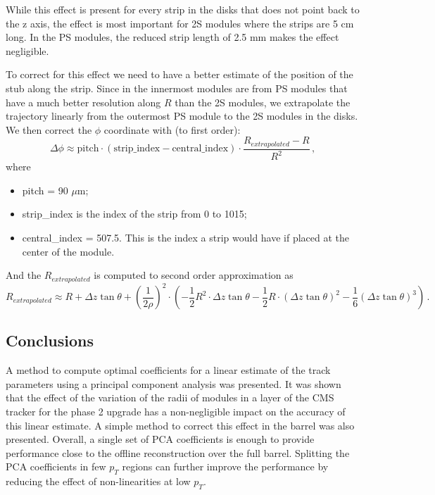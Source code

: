 \documentclass[10pt,a4paper]{report}
\begin{document}
While this effect is present for every strip in the disks that does not point back to the z axis, the effect is most important for 2S modules where the strips are 5 cm long. In the PS modules, the reduced strip length of 2.5 mm makes the effect negligible.

To correct for this effect we need to have a better estimate of the position of the stub along the strip. Since in the innermost modules are from PS modules that have a much better resolution along $R$ than the 2S modules, we extrapolate the trajectory linearly from the outermost PS module to the 2S modules in the disks. We then correct the $\phi$ coordinate with (to first order):
\begin{equation}
\Delta\phi \approx \mbox{pitch} \cdot (\mbox{strip\_index} - \mbox{central\_index}) \cdot \frac{R_{extrapolated} - R}{R^2} \, ,
\end{equation}
where
\begin{itemize}
\item pitch = 90 $\mu$m;
\item strip\_index is the index of the strip from 0 to 1015;
\item central\_index = 507.5. This is the index a strip would have if placed at the center of the module.
\end{itemize}
And the $R_{extrapolated}$ is computed to second order approximation as
\begin{equation}
R_{extrapolated} \approx R + \Delta z \tan\theta + \left(\frac{1}{2\rho}\right)^2 \cdot \left(-\frac12R^2 \cdot \Delta z \tan \theta - \frac12 R \cdot (\Delta z\tan \theta)^2 - \frac16 (\Delta z \tan \theta)^3\right) \, .
\end{equation}


\subsection{Conclusions}

A method to compute optimal coefficients for a linear estimate of the track parameters using a principal component analysis was presented. It was shown that the effect of the variation of the radii of modules in a layer of the CMS tracker for the phase 2 upgrade has a non-negligible impact on the accuracy of this linear estimate. A simple method to correct this effect in the barrel was also presented. Overall, a single set of PCA coefficients is enough to provide performance close to the offline reconstruction over the full barrel. Splitting the PCA coefficients in few $p_T$ regions can further improve the performance by reducing the effect of non-linearities at low $p_T$.
\end{document}
